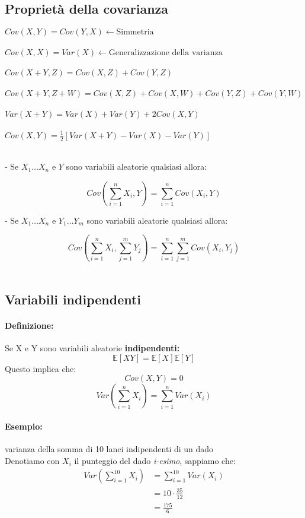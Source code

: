 \documentclass[]{article}
\newcommand{\ev}{\mathbb{E}[X]}
\renewcommand{\ev}[1]{\mathbb{E}[#1]}
\newcommand{\definizione}{\paragraph{Definizione:}}
\begin{document}
    \subsection{Proprietà della covarianza}
    $ Cov(X, Y) = Cov(Y, X) \longleftarrow \text{Simmetria} $ \\ \\
    $ Cov(X, X) = Var(X) \longleftarrow \text{Generalizzazione della varianza} $ \\ \\
    $ Cov(X+Y, Z) = Cov(X, Z) + Cov(Y, Z) $ \\ \\
    $ Cov(X+Y, Z+W) = Cov(X, Z) + Cov(X, W) + Cov(Y, Z) + Cov(Y, W) $ \\ \\
    $ Var(X + Y) = Var(X) + Var(Y) + 2 Cov(X, Y) $ \\ \\
    $ Cov(X,Y) = \frac{1}{2}[Var(X+Y) - Var(X) - Var(Y)] $ \\ \\
    \centerline{- Se $X_1 \ldots X_n$ e $Y $ sono variabili aleatorie qualsiasi allora:}
    \[ Cov(\sum_{i = 1}^{n}X_i, Y) = \sum_{i = 1}^{n} Cov(X_i, Y) \]
    \centerline{- Se $X_1 \ldots X_n$ e $Y_1 \ldots Y_m$ sono variabili aleatorie qualsiasi allora:}
    \[ Cov(\sum_{i = 1}^{n}X_i, \sum_{j = 1}^{m} Y_j) = \sum_{i = 1}^{n} \sum_{j = 1}^{m} Cov(X_i, Y_j) \] \\
    \subsection{Variabili indipendenti}
    \definizione Se X e Y sono variabili aleatorie \textbf{indipendenti:}
    \[ \ev{XY} = \ev{X} \ev{Y} \]
    Questo implica che:
    \[ Cov(X, Y) = 0 \]
    \[ \displaystyle{Var(\sum_{i = 1}^{n} X_i) = \sum_{i = 1}^{n} Var(X_i)}\]
    \paragraph{Esempio:} varianza della somma di 10 lanci indipendenti di un dado \\
    Denotiamo con \textbf{$X_i$} il punteggio del dado \textit{i-esimo}, sappiamo che:
    \begin{equation*}
        \begin{split}
            Var(\sum_{i = 1}^{10} X_i) &= \sum_{i = 1}^{10} Var(X_i) \\
            & = 10 \cdot \frac{35}{12} \\
            & = \frac{175}{6}
        \end{split}
    \end{equation*}
\end{document}
